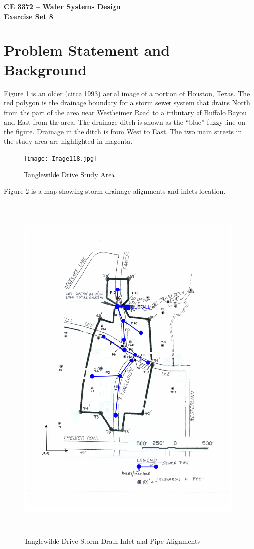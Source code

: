 \documentclass[12pt]{article}
\begin{document}
\begin{center}
{\textbf{{ CE 3372 -- Water Systems Design} \\ {Exercise Set 8}}}
\end{center}

\section*{\small{Problem Statement and Background}}
Figure \ref{fig:aerial} is an older (circa 1993) aerial image of a portion of Houston, Texas.   
The red polygon is the drainage boundary for a storm sewer system that drains North from the part of the area near Westheimer Road to a tributary of Buffalo Bayou and East from the area.
The drainage ditch is shown as the ``blue''   fuzzy line on the figure.  
Drainage in the ditch is from West to East.
The two main streets in the study area are highlighted in magenta.  
\begin{figure}[h!] %
   \centering
   \texttt{[image: Image118.jpg]} 
   \caption{Tanglewilde Drive Study Area}
   \label{fig:aerial}
\end{figure}
\clearpage

Figure \ref{fig:survey} is a map showing storm drainage alignments and inlets location.  
\begin{figure}[h!] %
   \centering
   \includegraphics[height=7in]{Image119B.jpg} 
   \caption{Tanglewilde Drive Storm Drain Inlet and Pipe Alignments}
   \label{fig:survey}
\end{figure}
\end{document}
